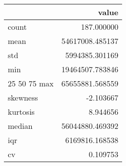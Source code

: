 \begin{tabular}{lr}
\toprule
 & value \\
\midrule
count & 187.000000 \\
mean & 54617008.485137 \\
std & 5994385.301169 \\
min & 19464507.783846 \\
25%
50%
75%
max & 65655881.568559 \\
skewness & -2.103667 \\
kurtosis & 8.944656 \\
median & 56044880.469392 \\
iqr & 6169816.168538 \\
cv & 0.109753 \\
\bottomrule
\end{tabular}
